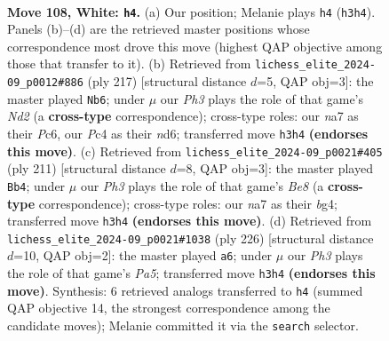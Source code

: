 \documentclass[11pt]{article}
\begin{document}
\clearpage

\begin{figure}[p]\centering
\begin{subfigure}{0.46\textwidth}\centering
\resizebox{\linewidth}{!}{%
\newchessgame
\chessboard[
  setfen={B7/n5k1/8/6PK/2P5/7P/8/8 w - - 1 108},
  showmover=false,
  pgfstyle=straightmove, color=movearrow, markmove={h3-h4}
]}
\caption{}
\end{subfigure}\hfill
\begin{subfigure}{0.46\textwidth}\centering
\resizebox{\linewidth}{!}{%
\newchessgame
\chessboard[
  setfen={8/3n4/k1pN4/p7/8/K7/8/8 b - - 25 109},
  showmover=false,
  pgfstyle=straightmove, color=movearrow, markmove={d7-b6}
]}
\caption{}
\end{subfigure}
\\[4pt]
\begin{subfigure}{0.46\textwidth}\centering
\resizebox{\linewidth}{!}{%
\newchessgame
\chessboard[
  setfen={8/4k3/5p2/3K2p1/6B1/8/8/4b3 b - - 19 106},
  showmover=false,
  pgfstyle=straightmove, color=movearrow, markmove={e1-b4}
]}
\caption{}
\end{subfigure}\hfill
\begin{subfigure}{0.46\textwidth}\centering
\resizebox{\linewidth}{!}{%
\newchessgame
\chessboard[
  setfen={2k5/8/1P6/P1K5/8/2P5/8/8 w - - 1 114},
  showmover=false,
  pgfstyle=straightmove, color=movearrow, markmove={a5-a6}
]}
\caption{}
\end{subfigure}
\caption{\textbf{Move 108, White: \texttt{h4}.} (a) Our position; Melanie plays \texttt{h4} (\texttt{h3h4}). Panels (b)--(d) are the retrieved master positions whose correspondence most drove this move (highest QAP objective among those that transfer to it). (b) Retrieved from \texttt{lichess\_elite\_2024-09\_p0012\#886} (ply 217) [structural distance $d$=5, QAP obj=3]: the master played \texttt{Nb6}; under $\mu$ our \emph{Ph3} plays the role of that game's \emph{Nd2} (a \textbf{cross-type} correspondence); cross-type roles: our \emph{n}a7 as their \emph{P}c6, our \emph{P}c4 as their \emph{n}d6; transferred move \texttt{h3h4} \textbf{(endorses this move)}. (c) Retrieved from \texttt{lichess\_elite\_2024-09\_p0021\#405} (ply 211) [structural distance $d$=8, QAP obj=3]: the master played \texttt{Bb4}; under $\mu$ our \emph{Ph3} plays the role of that game's \emph{Be8} (a \textbf{cross-type} correspondence); cross-type roles: our \emph{n}a7 as their \emph{b}g4; transferred move \texttt{h3h4} \textbf{(endorses this move)}. (d) Retrieved from \texttt{lichess\_elite\_2024-09\_p0021\#1038} (ply 226) [structural distance $d$=10, QAP obj=2]: the master played \texttt{a6}; under $\mu$ our \emph{Ph3} plays the role of that game's \emph{Pa5}; transferred move \texttt{h3h4} \textbf{(endorses this move)}. Synthesis: 6 retrieved analogs transferred to \texttt{h4} (summed QAP objective 14, the strongest correspondence among the candidate moves); Melanie committed it via the \texttt{search} selector.}
\label{fig:thought-m214}
\end{figure}
\end{document}
